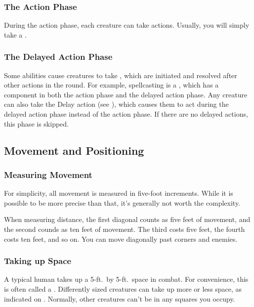         \subsubsection{The Action Phase}\label{The Action Phase}
            During the action phase, each creature can take actions.
            Usually, you will simply take a .

        \subsubsection{The Delayed Action Phase}\label{The Delayed Action Phase}
            Some abilities cause creatures to take , which are initiated and resolved after other actions in the round.
            For example, spellcasting is a , which has a component in both the action phase and the delayed action phase.
            Any creature can also take the Delay action (see ), which causes them to act during the delayed action phase instead of the action phase.
            If there are no delayed actions, this phase is skipped.

    \subsection{Movement and Positioning}\label{Movement and Positioning}

        \subsubsection{Measuring Movement}

            For simplicity, all movement is measured in five-foot increments.
            While it is possible to be more precise than that, it's generally not worth the complexity.

             When measuring distance, the first diagonal counts as five feet of movement, and the second counds as ten feet of movement.
            The third costs five feet, the fourth costs ten feet, and so on.
            You can move diagonally past corners and enemies.

        \subsubsection{Taking up Space}
            A typical human takes up a 5-ft.\ by 5-ft.\ space in combat.
            For convenience, this is often called a .
            Differently sized creatures can take up more or less space, as indicated on .
            Normally, other creatures can't be in any squares you occupy.

